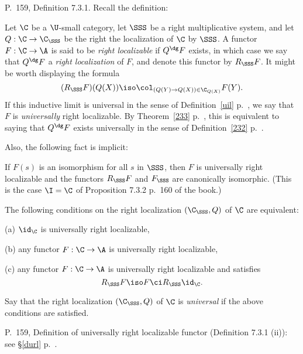 \documentclass[12pt]{article}
\theoremstyle{remark}
\theoremstyle{definition}
\begin{document}
%

\begin{s} 
P.~159, Definition 7.3.1. Recall the definition: 

Let $\C$ be a $\U$-small category, let $\SSS$ be a right multiplicative system, and let $Q:\C\to\C_\SSS$ be the right the localization of $\C$ by $\SSS$. A functor $F:\C\to\A$ is said to be {\em right localizable} if $Q^\dg F$ exists, in which case we say that $Q^\dg F$ a {\em right localization} of $F$, and denote this functor by $R_\SSS F$. It might be worth displaying the formula 
$$
(R_\SSS F)(Q(X))\iso\col_{(Q(Y)\to Q(X))\in\C_{Q(X)}}F(Y).
$$
If this inductive limit is universal in the sense of Definition~\ref{uil} p.~, we say that $F$ is {\em universally} right localizable.  By Theorem~\ref{233} p.~, this is equivalent to saying that $Q^\dg F$ exists universally in the sense of Definition~\ref{232} p.~. 

Also, the following fact is implicit:

If $F(s)$ is an isomorphism for all $s$ in $\SSS$, then $F$ is universally right localizable and the functors $R_\SSS F$ and $F_\SSS$ are canonically isomorphic. (This is the case $\I=\C$ of Proposition 7.3.2 p.~160 of the book.)

The following conditions on the right localization $(\C_\SSS,Q)$ of $\C$ are equivalent: 

\nn(a) $\id_\C$ is universally right localizable, 

\nn(b) any functor $F:\C\to\A$ is universally right localizable, 

\nn(c) any functor $F:\C\to\A$ is universally right localizable and satisfies 
$$
R_\SSS F\iso F\ci R_\SSS\id_\C.
$$

\begin{df} 
Say that the right localization $(\C_\SSS,Q)$ of $\C$ is {\em universal} if the above conditions are satisfied.
\end{df}
\end{s}

%

\begin{s}
P.~159, Definition of universally right localizable functor (Definition 7.3.1 (ii)): see \S\ref{durl} p.~. 
\end{s}

%
\end{document}
